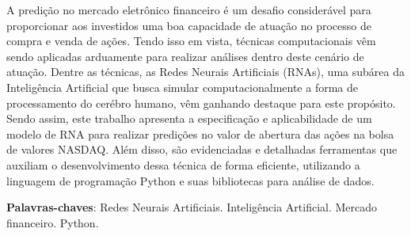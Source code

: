 \begin{resumo}[RESUMO]	
A predição no mercado eletrônico financeiro é um desafio considerável para proporcionar aos investidos uma boa capacidade de atuação no processo de compra e venda de ações. Tendo isso em vista, técnicas computacionais vêm sendo aplicadas arduamente para realizar análises dentro deste cenário de atuação. Dentre as técnicas, as Redes Neurais Artificiais (RNAs), uma subárea da Inteligência Artificial que busca simular computacionalmente a forma de processamento do cerébro humano, vêm ganhando destaque para este propósito. Sendo assim, este trabalho apresenta a especificação e aplicabilidade de um modelo de RNA para realizar predições no valor de abertura das ações na bolsa de valores NASDAQ. Além disso, são evidenciadas e detalhadas ferramentas que auxiliam o desenvolvimento dessa técnica de forma eficiente, utilizando a linguagem de programação Python e suas bibliotecas para análise de dados.

\vspace{\onelineskip}
    
\noindent
\textbf{Palavras-chaves}: Redes Neurais Artificiais. Inteligência Artificial. Mercado financeiro. Python.
\end{resumo}
